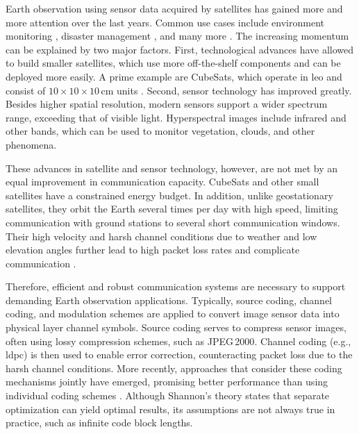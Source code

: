 \documentclass[conference]{IEEEtran}
\newcommand\jpegtwok{JPEG\,2000\xspace}
\begin{document}
Earth observation using sensor data acquired by satellites has gained more and more attention over the last years.
Common use cases include environment monitoring \cite{rs14030589}, disaster management \cite{barmpoutis2020}, and many more \cite{radix,MarCO}.
The increasing momentum can be explained by two major factors.
First, technological advances have allowed to build smaller satellites, which use more off-the-shelf components and can be deployed more easily.
A prime example are CubeSats, which operate in \ac{leo} and consist of $10 \times 10 \times 10$\,cm units \cite{cubesat2020}.
Second, sensor technology has improved greatly.
Besides higher spatial resolution, modern sensors support a wider spectrum range, exceeding that of visible light.
Hyperspectral images include infrared and other bands, which can be used to monitor vegetation, clouds, and other phenomena. %

These advances in satellite and sensor technology, however, are not met by an equal improvement in communication capacity.
CubeSats and other small satellites have a constrained energy budget. %
In addition, unlike geostationary satellites, they orbit the Earth several times per day with high speed, limiting communication with ground stations to several short communication windows.
Their high velocity and harsh channel conditions due to weather and low elevation angles further lead to high packet loss rates and complicate communication \cite{nogales2018}.

Therefore, efficient and robust communication systems are necessary to support demanding Earth observation applications.
Typically, source coding, channel coding, and modulation schemes are applied to convert image sensor data into physical layer channel symbols.
Source coding serves to compress sensor images, often using lossy compression schemes, such as \jpegtwok \cite{sentinel-2-user-handbook}.
Channel coding (e.g., \ac{ldpc}) is then used to enable error correction, counteracting packet loss due to the harsh channel conditions.
More recently, approaches that consider these coding mechanisms jointly have emerged, promising better performance than using individual coding schemes \cite{6408177}.
Although Shannon's theory \cite{cover1991elements} states that separate optimization can yield optimal results, its assumptions are not always true in practice, such as infinite code block lengths.
\end{document}
